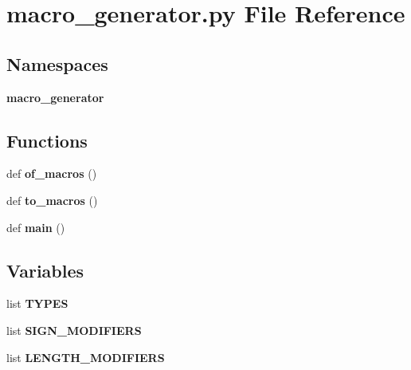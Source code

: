 \section{macro\+\_\+generator.\+py File Reference}
\label{macro__generator_8py}
\subsection*{Namespaces}
\begin{DoxyCompactItemize}
\item 
 {\bf macro\+\_\+generator}
\end{DoxyCompactItemize}
\subsection*{Functions}
\begin{DoxyCompactItemize}
\item 
def {\bf of\+\_\+macros} ()
\item 
def {\bf to\+\_\+macros} ()
\item 
def {\bf main} ()
\end{DoxyCompactItemize}
\subsection*{Variables}
\begin{DoxyCompactItemize}
\item 
list {\bf T\+Y\+P\+ES}
\item 
list {\bf S\+I\+G\+N\+\_\+\+M\+O\+D\+I\+F\+I\+E\+RS}
\item 
list {\bf L\+E\+N\+G\+T\+H\+\_\+\+M\+O\+D\+I\+F\+I\+E\+RS}
\end{DoxyCompactItemize}
